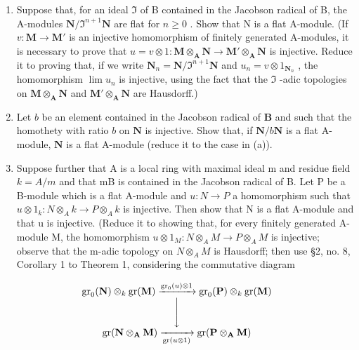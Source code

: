 \begin{enumerate}
\def\labelenumi{(\alph{enumi})}
\item
  Suppose that, for an ideal \(\mathfrak{I}\) of B contained in the Jacobson radical of B, the A-modules \(\mathbf{N} / \mathfrak{I}^{n + 1}\mathbf{N}\) are flat for \(n\geqslant 0\) . Show that N is a flat A-module. (If \(v\colon \mathbf{M}\to \mathbf{M}'\) is an injective homomorphism of finitely generated A-modules, it is necessary to prove that \(u = v\otimes 1:\mathbf{M}\otimes_{\mathbf{A}}\mathbf{N}\rightarrow \mathbf{M}'\otimes_{\mathbf{A}}\mathbf{N}\) is injective. Reduce it to proving that, if we write \(\mathbf{N}_n = \mathbf{N} / \mathfrak{I}^{n + 1}\mathbf{N}\) and \(u_{n} = v\otimes 1_{\mathbf{N}_{n}}\) , the homomorphism \(\lim u_n\) is injective, using the fact that the \(\mathfrak{I}\) -adic topologies on \(\mathbf{M}\otimes_{\mathbf{A}}\mathbf{N}\) and \(\mathbf{M}'\otimes_{\mathbf{A}}\mathbf{N}\) are Hausdorff.)
\item
  Let \(b\) be an element contained in the Jacobson radical of \(\mathbf{B}\) and such that the homothety with ratio \(b\) on \(\mathbf{N}\) is injective. Show that, if \(\mathbf{N} / b\mathbf{N}\) is a flat A-module, \(\mathbf{N}\) is a flat A-module (reduce it to the case in (a)).
\item
  Suppose further that A is a local ring with maximal ideal m and residue field \(k = A/m\) and that mB is contained in the Jacobson radical of B. Let P be a B-module which is a flat A-module and \(u: N \to P\) a homomorphism such that \(u \otimes 1_k: N \otimes_A k \to P \otimes_A k\) is injective. Then show that N is a flat A-module and that u is injective. (Reduce it to showing that, for every finitely generated A-module M, the homomorphism \(u \otimes 1_M: N \otimes_A M \to P \otimes_A M\) is injective; observe that the m-adic topology on \(N \otimes_A M\) is Hausdorff; then use §2, no. 8, Corollary 1 to Theorem 1, considering the commutative diagram
\end{enumerate}

\[
\begin{array}{c} \operatorname{gr} _ {0} (\mathbf {N}) \otimes_ {k} \operatorname{gr} (\mathbf {M}) \xrightarrow {\operatorname{gr} _ {0} (u) \otimes 1} \operatorname{gr} _ {0} (\mathbf {P}) \otimes_ {k} \operatorname{gr} (\mathbf {M}) \\ \Biggl \downarrow \\ \operatorname{gr} (\mathbf {N} \otimes_ {\mathbf {A}} \mathbf {M}) \xrightarrow [ \operatorname{gr} (u \otimes 1) ]{} \operatorname{gr} (\mathbf {P} \otimes_ {\mathbf {A}} \mathbf {M}) \end{array}
\]

